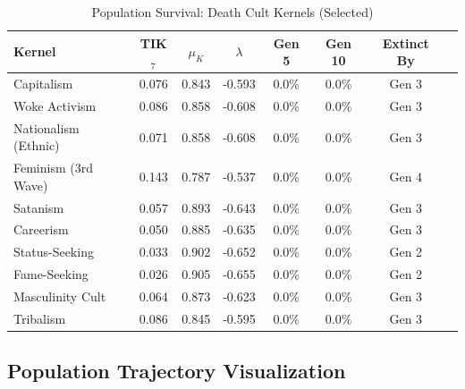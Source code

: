 \documentclass[11pt,a4paper]{article}
\theoremstyle{definition}
\theoremstyle{remark}
\begin{document}
\begin{table}[H]
\centering
\caption{Population Survival: Death Cult Kernels (Selected)}
\label{tab:pop-deathcult}
\begin{tabular}{@{}lccccccc@{}}
\toprule
\textbf{Kernel} & \textbf{TIK$_7$} & $\mu_K$ & $\lambda$ & \textbf{Gen 5} & \textbf{Gen 10} & \textbf{Extinct By} \\
\midrule
Capitalism & 0.076 & 0.843 & -0.593 & 0.0\% & 0.0\% & Gen 3 \\
Woke Activism & 0.086 & 0.858 & -0.608 & 0.0\% & 0.0\% & Gen 3 \\
Nationalism (Ethnic) & 0.071 & 0.858 & -0.608 & 0.0\% & 0.0\% & Gen 3 \\
Feminism (3rd Wave) & 0.143 & 0.787 & -0.537 & 0.0\% & 0.0\% & Gen 4 \\
Satanism & 0.057 & 0.893 & -0.643 & 0.0\% & 0.0\% & Gen 3 \\
Careerism & 0.050 & 0.885 & -0.635 & 0.0\% & 0.0\% & Gen 3 \\
Status-Seeking & 0.033 & 0.902 & -0.652 & 0.0\% & 0.0\% & Gen 2 \\
Fame-Seeking & 0.026 & 0.905 & -0.655 & 0.0\% & 0.0\% & Gen 2 \\
Masculinity Cult & 0.064 & 0.873 & -0.623 & 0.0\% & 0.0\% & Gen 3 \\
Tribalism & 0.086 & 0.845 & -0.595 & 0.0\% & 0.0\% & Gen 3 \\
\bottomrule
\end{tabular}
\end{table}

\subsection{Population Trajectory Visualization}
\end{document}
